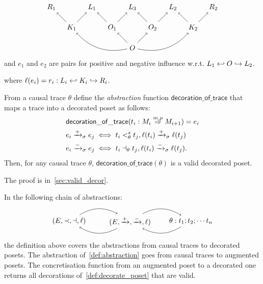 \begin{definition}
\begin{description}
\[\begin{tikzpicture}
      \node (o) at (0,-1) {\(O\)};
      \node (r3) at (0,1) {\(L_3\)};
      \node (o1) at (-1,0) {\(O_1\)};
      \node (o2) at (1,0) {\(O_2\)};
      \node (r1) at (-2,1) {\(L_1\)};
      \node (r2) at (2,1) {\(L_2\)};
      \node (l1) at (-4,1) {\(R_1\)};
      \node (l2) at (4,1) {\(R_2\)};
      \node (k1) at (-3,0) {\(K_1\)};
      \node (k2) at (3,0) {\(K_2\)};
      \draw [->] (o) -- (o1);
      \draw [->] (o) -- (o2);
      \draw [->] (o1) -- (r3);
      \draw [->] (o2) -- (r3);
      \draw [->] (o1) -- (r1);
      \draw [->] (o2) -- (r2);
      \draw [->] (k1) -- (r1);
      \draw [->] (k2) -- (r2);
      \draw [->] (k1) -- (l1);
      \draw [->] (k2) -- (l2);
      \draw [->] (o) to [bend left] (k1);
      \draw [->] (o) to [bend right] (k2);
    \end{tikzpicture}
    \]
    and $e_1$ and $e_2$ are pairs for positive and negative influence w.r.t. $L_1\hookleftarrow O\hookrightarrow L_2$.
  \end{description}
  where $\ell(e_i)=r_i:L_i\hookleftarrow K_i\hookrightarrow R_i$.
\end{definition}

\begin{lemma}
  \label{prop:constraints_poset}
  From a causal trace $\theta$ define the \emph{abstraction} function $\mathsf{decoration\_of\_trace}$ that maps a trace into a decorated poset as follows:
  \begin{align*}
    &\mathsf{decoration\_of\_trace}(t_i:M_i\overset{m,p}{\Rightarrow} M_{i+1}) = e_i \\
    &e_i \mathrel{\xrightarrow{+}}_{\sigma} e_j \iff t_i <_{\theta}^s t_j, \ell(t_i)\mathrel{\xrightarrow{+}}_{\sigma} \ell(t_j)\\
    &e_i \mathrel{\xrightarrow{-}}_{\sigma} e_j \iff t_i \dashv_{\theta} t_j, \ell(t_i) \mathrel{\xrightarrow{-}}_{\sigma} \ell(t_j).
  \end{align*}
  Then, for any causal trace $\theta$, $\mathsf{decoration\_of\_trace}(\theta)$ is a valid decorated poset.
\end{lemma}
The proof is in~\autoref{sec:valid_decor}.

In the following chain of abstractions:
  \[
  \begin{tikzpicture} %
    \node (as) at (3,0) {\((E,\prec,\dashv,\labl)\)};
    \node (ds) at (6,0) {\((E,\redl{+},\redl{-},\labl)\)};
    \node (trace) at (9,0) {\(\theta:t_1;t_2;\cdots t_n\)};
    \draw [->] (ds) to [bend left] (as);
    \draw [->] (as) to [bend left] (ds);
    \draw [->] (ds) to [bend left] (trace);
    \draw [->] (trace) to [bend left] (ds);
  \end{tikzpicture}
  \]
the definition above covers the abstractions from causal traces to decorated posets. The abstraction of~\autoref{def:abstraction} goes from causal traces to augmented posets. The concretisation function from an augmented poset to a decorated one returns all decorations of~\autoref{def:decorate_poset} that are valid.

